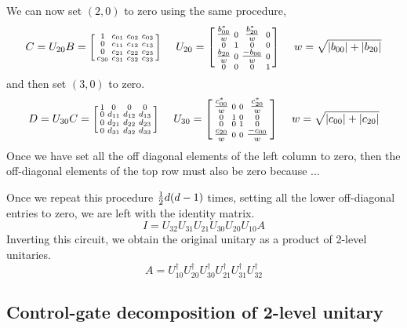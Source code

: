 We can now set $(2,0)$ to zero using the same procedure, 
\[
C = U_{20} B = \begin{bsmallmatrix}
    1 & c_{01} & c_{02} & c_{03} \\ 
    0 & c_{11} & c_{12} & c_{13} \\
    0 & c_{21} & c_{22} & c_{23} \\    
    c_{30} & c_{31} & c_{32} & c_{33}    
    \end{bsmallmatrix}
    \  \quad
 	U_{20} = \begin{bsmallmatrix}
    \tfrac{b^*_{00}}{w} & 0 & \tfrac{b^*_{20}}{w} & 0\\ 
    0 & 1 & 0 & 0 \\     
    \tfrac{b_{20}}{w} & 0 & \tfrac{-b_{00}}{w} & 0 \\   
    0 & 0 & 0 & 1    
    \end{bsmallmatrix}
\  \quad w = \sqrt{|b_{00}| + |b_{20}|}
\notag
\]
and then set $(3,0)$ to zero. 
\[
D = U_{30} C = \begin{bsmallmatrix}
    1 & 0 & 0 & 0 \\ 
    0 & d_{11} & d_{12} & d_{13} \\
    0 & d_{21} & d_{22} & d_{23} \\    
    0 & d_{31} & d_{32} & d_{33}    
    \end{bsmallmatrix}
    \  \quad
 	U_{30} = \begin{bsmallmatrix}
    \tfrac{c^*_{00}}{w} & 0 & 0 & \tfrac{c^*_{20}}{w}\\ 
    0 & 1 & 0 & 0 \\      
    0 & 0 & 1 & 0 \\   
    \tfrac{c_{20}}{w} & 0 & 0 & \tfrac{-c_{00}}{w}
    \end{bsmallmatrix}
\  \quad w = \sqrt{|c_{00}| + |c_{20}|}
\notag
\]
Once we have set all the off diagonal elements of the left column to zero, then the off-diagonal elements of the top row must also be zero because ... 

Once we repeat this procedure $\tfrac{1}{2} d(d-1)$ times, setting all the lower off-diagonal entries to zero,  we are left with the identity matrix.
\[
I = U_{32} U_{31} U_{21} U_{30} U_{20} U_{10} A
\]
Inverting this circuit, we obtain the original unitary as a product of 2-level unitaries. 
\[
A = U^{\dagger}_{10} U^{\dagger}_{20} U^{\dagger}_{30} U^{\dagger}_{21} U^{\dagger}_{31} U^{\dagger}_{32}
\]

\subsection{Control-gate decomposition of 2-level unitary}




